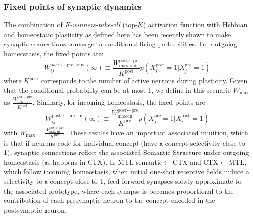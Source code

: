 \documentclass{article}
\begin{document}
\subsubsection*{Fixed points of synaptic dynamics}
The combination of \textit{K-winners-take-all} ($\textrm{top-}K$) activation function with Hebbian and homeostatic plasticity as defined here has been recently shown  to make synaptic connections converge to conditional firing probabilities. For outgoing homeostasis, the fixed points are:
  \begin{equation}
     W_{ij}^{\textrm{post}\leftarrow\textrm{pre}, \; \textrm{out}}(\infty) \equiv \frac{W_\textrm{max-out}^{\textrm{post}\leftarrow\textrm{pre}}}{K^\textrm{post}}p(X^\textrm{post}_i = 1| X^\textrm{pre}_j = 1)
 \end{equation}
 where $K^\textrm{post}$ corresponds to the number of active neurons during plasticity. Given that the conditional probability can be at most 1, we define in this scenario $W_\textrm{max}$ as $\frac{W_\textrm{max-out}^{\textrm{post}\leftarrow\textrm{pre}}}{K^\textrm{post}}$. Similarly, for incoming homeostasis, the fixed points are
   \begin{equation}
   W_{ij}^{\textrm{post}\leftarrow\textrm{pre}, \; \textrm{in}}(\infty) \equiv \frac{W_\textrm{max-in}^{\textrm{post}\leftarrow\textrm{pre}}}{K^\textrm{pre}}p(X^\textrm{pre}_j = 1| X^\textrm{post}_i = 1)
 \end{equation}
 with $W_\textrm{max}=\frac{W_\textrm{max-in}^{\textrm{post}\leftarrow\textrm{pre}}}{K^\textrm{pre}}$. These results have an important associated intuition, which is that if neurons code for individual concept (have a concept selectivity close to 1), synaptic connections reflect the associated Semantic Structure  under outgoing homeostasis (as happens in CTX). In MTL-semantic$\leftarrow$CTX and CTX$\leftarrow$MTL, which follow incoming homeostasis, when initial one-shot receptive fields induce a selectivity to a concept close to 1, feed-forward synapses slowly approximate to the associated prototype, where each synapse is becomes proportional to the contribution of each presynaptic neuron to the concept encoded in the postsynaptic neuron.
\end{document}
